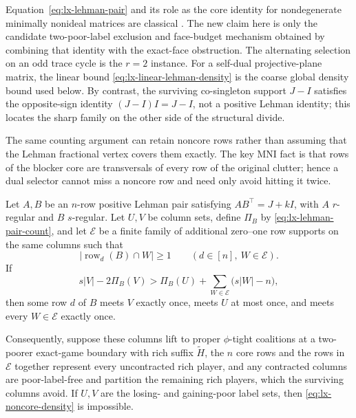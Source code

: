 Equation~\eqref{eq:lx-lehman-pair} and its role as the core identity for
nondegenerate minimally nonideal matrices are classical
\citep{CornuejolsGueninTuncel2009}.  The new claim here is only the
candidate two-poor-label exclusion and face-budget mechanism obtained by
combining that identity with the exact-face obstruction.  The alternating
selection on an odd trace cycle is the $r=2$ instance.  For a self-dual
projective-plane matrix, the linear
bound \eqref{eq:lx-linear-lehman-density} is the coarse global density bound
used below.  By contrast, the surviving co-singleton support $J-I$ satisfies
the opposite-sign identity $(J-I)I=J-I$, not a positive Lehman identity;
this locates the sharp family on the other side of the structural divide.

The same counting argument can retain noncore rows rather than assuming that
the Lehman fractional vertex covers them exactly.  The key MNI fact is that
rows of the blocker core are transversals of every row of the original
clutter; hence a dual selector cannot miss a noncore row and need only avoid
hitting it twice.

\begin{corollary}
\label{cor:lx-noncore-lehman-rounding}
Let $A,B$ be an $n$-row positive Lehman pair satisfying
$AB^\top=J+kI$, with $A$ $r$-regular and $B$ $s$-regular.  Let $U,V$ be
column sets, define $\Pi_B$ by \eqref{eq:lx-lehman-pair-count}, and let
$\mathcal E$ be a finite family of additional zero--one row supports on the
same columns such that
\[
 |\operatorname{row}_d(B)\cap W|\geq1
 \qquad(d\in[n],\ W\in\mathcal E).                \tag{NC-1}
 \label{eq:lx-noncore-transversal}
\]
If
\[
 s|V|-2\Pi_B(V)>
 \Pi_B(U)+\sum_{W\in\mathcal E}
       \bigl(s|W|-n\bigr),                         \tag{NC-2}
 \label{eq:lx-noncore-density}
\]
then some row $d$ of $B$ meets $V$ exactly once, meets $U$ at most once,
and meets every $W\in\mathcal E$ exactly once.

Consequently, suppose these columns lift to proper $\phi$-tight coalitions
at a two-poorer exact-game boundary with rich suffix $\widetilde H$, the
$n$ core rows and the rows in $\mathcal E$ together represent every
uncontracted rich player, and any contracted columns are poor-label-free and
partition the remaining rich players, which the surviving columns avoid.
If $U,V$ are the losing- and
gaining-poor label sets, then \eqref{eq:lx-noncore-density} is impossible.
\end{corollary}

